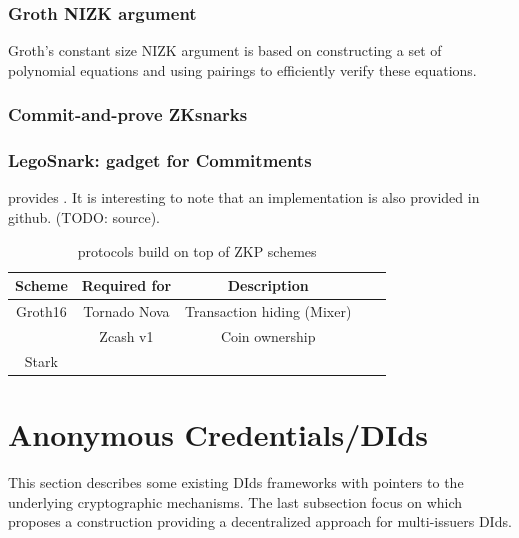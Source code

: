 \documentclass[11pt]{llncs2e/llncs}
\begin{document}
\subsubsection{Groth NIZK argument}
Groth’s constant size NIZK argument is based on constructing a set of polynomial equations and using pairings to efficiently verify these equations.

\subsubsection{Commit-and-prove ZKsnarks}

\subsubsection{LegoSnark: gadget for Commitments}

\cite{LegoSnark} provides . It is interesting to note that an implementation is also provided in github. (TODO: source).

\begin{table}
\begin{center}
 \begin{tabular}{ |c| c|c|c|c|}
  \hline
  Scheme & Required for & Description \\
  \hline\hline
  Groth16  & Tornado Nova & Transaction hiding (Mixer)\\
           & Zcash v1& Coin ownership\\
  \hline
  Stark && \\
  \hline
  
  \hline
  
 \end{tabular}
 \end{center}
 \caption{protocols build on top of ZKP schemes}
 \label{tab-usecommit}
\end{table}
 
\section{Anonymous Credentials/DIds}

This section describes some existing DIds frameworks with pointers to the underlying cryptographic mechanisms. The last subsection focus on \cite{ElkhiyaouiCA21 } which proposes a construction providing a decentralized approach for multi-issuers DIds.
\end{document}
